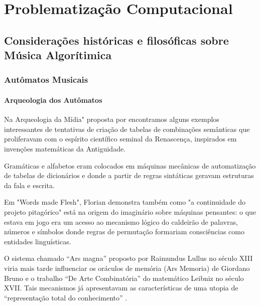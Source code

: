\documentclass[
	12pt,				%
	openright,			%
	twoside,			%
	a4paper,			%
	english,			%
	french,				%
	spanish,			%
	brazil				%
	]{abntex2}
\begin{document}
\part{Problematização Computacional}
\label{computacional}




\chapter{Considerações históricas e filosóficas sobre Música Algorítimica}


\section{Autômatos Musicais}

\subsection{Arqueologia dos Autômatos}

Na Arqueologia da Mídia" proposta por  encontramos alguns exemplos interessantes de tentativas de criação de tabelas de combinações semânticas que proliferavam com o espírito científico seminal da Renascença, inspirados em invenções matemáticas da Antiguidade. 

Gramáticas e alfabetos eram colocados em máquinas mecânicas de automatização de tabelas de dicionários e donde a partir de regras sintáticas geravam estruturas da fala e escrita. 

Em "Words made Flesh", Florian  demonstra também como "a continuidade do projeto pitagórico" está na origem do imaginário sobre máquinas pensantes: o que estava em jogo era um acesso ao mecanismo lógico do caldeirão de palavras, números e símbolos donde regras de permutação formariam consciências como entidades linguísticas.

O sistema chamado “Ars magna” proposto por Raimundus Lullus no século XIII viria mais tarde influenciar  os oráculos de memória (Ars Memoria) de Giordano Bruno e o trabalho “De Arte Combinatória” do matemático Leibniz no século XVII. Tais mecanismos já apresentavam as características de uma utopia de “representação total do conhecimento” \cite[p. 26]{zielinski2006arqueologia} .
\end{document}
